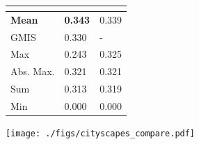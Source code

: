 \begin{figure}
\begin{minipage}[T]{0.48\textwidth}
\begin{tabular}{l M{0.25\textwidth} M{0.25\textwidth}}
         &  &  \\ \midrule
\textbf{Mean}& \textbf{0.343}  & 0.339  \\
GMIS \cite{liu2018affinity} & 0.330 & -  \\
Max &   0.243  &   0.325  \\
Abs. Max.  & 0.321 & 0.321 \\
Sum & 0.313  & 0.319  \\
Min &  0.000    & 0.000  \\
        \end{tabular}
    \label{tab:results_cityscapes}
\end{minipage}
\end{figure}
\begin{figure}[b]
\centering
\texttt{[image: ./figs/cityscapes\_compare.pdf]} %
\caption{
 \label{fig:cytiscapes_comparison}}
\end{figure}

